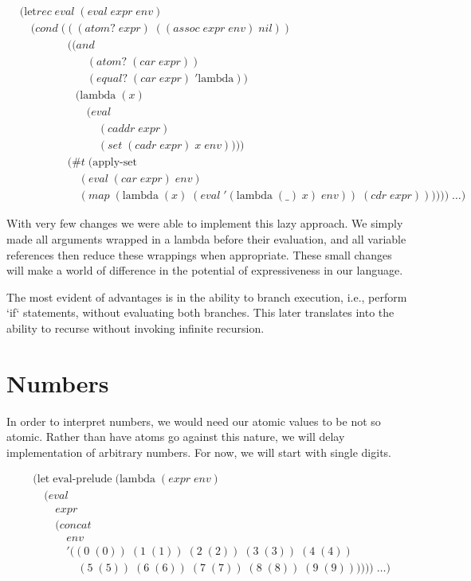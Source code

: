 \begin{align*}
& (\text{let}rec \; eval \; (eval \; expr \; env)
\\& \quad (cond \; (((atom? \; expr) \; ((assoc \; expr \; env) \; nil))
\\& \qquad \qquad \; ((and \; 
\\& \qquad \qquad \qquad (atom? \; (car \; expr)) \; 
\\& \qquad \qquad \qquad (equal? \; (car \; expr) \; '\text{lambda})) \; 
\\& \qquad \qquad \quad (\text{lambda} \; (x) \; 
\\& \qquad \qquad \qquad (eval \; 
\\& \qquad \qquad \qquad \quad (caddr \; expr) \; 
\\& \qquad \qquad \qquad \quad (set \; (cadr \; expr) \; x \; env))))
\\& \qquad \qquad \; (\#t \; (\text{apply-set} \; 
\\& \qquad \qquad \quad \; (eval \; (car \; expr) \; env) \; 
\\& \qquad \qquad \quad \; (map \; (\text{lambda} \; (x) \; (eval \; '(\text{lambda} \; (\_) \; x) \; env)) \; (cdr \; expr)))))) \; \dots)
\end{align*}

With very few changes we were able to implement this lazy approach. We simply made all arguments wrapped in a lambda before their evaluation, and all variable references then reduce these wrappings when appropriate. These small changes will make a world of difference in the potential of expressiveness in our language.

The most evident of advantages is in the ability to branch execution, i.e., perform `if` statements, without evaluating both branches. This later translates into the ability to recurse without invoking infinite recursion.

\section{Numbers}
In order to interpret numbers, we would need our atomic values to be not so atomic. Rather than have atoms go against this nature, we will delay implementation of arbitrary numbers. For now, we will start with single digits.

\begin{align*}
& (\text{let} \; \text{eval-prelude} \; (\text{lambda} \; (expr \; env)
\\& \quad (eval \; 
\\& \qquad expr
\\& \qquad (concat \; 
\\& \qquad \quad env \; 
\\& \qquad \quad '((0 \; (0)) \; (1 \; (1)) \; (2 \; (2)) \; (3 \; (3)) \; (4 \; (4)) \; 
\\& \qquad \qquad (5 \; (5)) \; (6 \; (6)) \; (7 \; (7)) \; (8 \; (8)) \; (9 \; (9)))))) \; \dots)
\end{align*}

